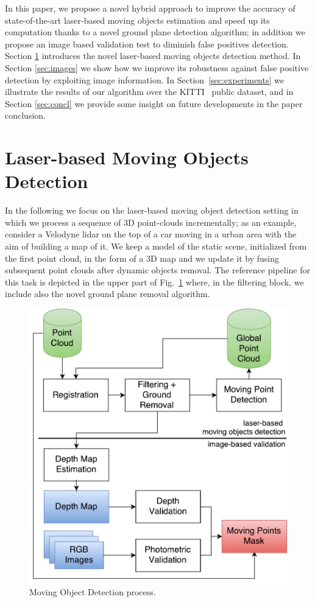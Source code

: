 In this paper, we propose a novel hybrid approach to improve the accuracy of state-of-the-art laser-based moving objects estimation and speed up its computation thanks to a novel ground plane detection algorithm; in addition we propose an image based validation test to diminish false positives detection. Section \ref{sec:lidar} introduces the novel laser-based moving objects detection method. In Section \ref{sec:images} we show how we improve its robustness against false positive detection by exploiting image information.
In Section~\ref{sec:experiments} we illustrate the results of our algorithm over the KITTI~\cite{Kitti} public dataset, and in Section \ref{sec:concl} we provide some insight on future developments in the paper conclusion.

\section{Laser-based Moving Objects Detection}%
\label{sec:lidar}
In the following we focus on the laser-based moving object detection setting in which we process a sequence of 3D point-clouds incrementally; as an example, consider a Velodyne lidar on the top of a car moving in a urban area with the aim of building a map of it. 
We keep a model of the static scene, initialized from the first point cloud, in the form of a 3D map and we update it by fusing subsequent point clouds after dynamic objects removal. 
The reference pipeline for this task is depicted in the upper part of Fig.~\ref{fig:algo} where, in the filtering block, we include also the novel ground plane removal algorithm.

\begin{figure}[t]
\centering
\includegraphics[width=0.77\columnwidth]{./img/ch-laser/MovingPointDetection}
\caption{Moving Object Detection process.}
\label{fig:algo}
\end{figure}
%
